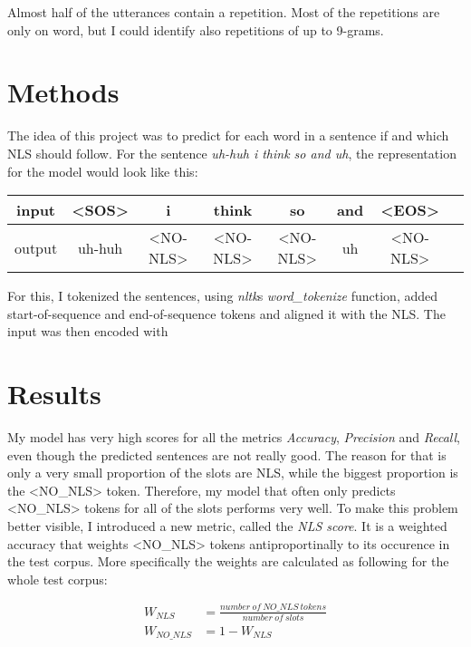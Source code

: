 \documentclass[
	11pt, %
]{fphw}
\begin{document}
Almost half of the utterances contain a repetition. Most of the repetitions are only on word, but I could identify also repetitions of up to 9-grams.





\section*{Methods}
The idea of this project was to predict for each word in a sentence if and which NLS should follow. For the sentence \emph{uh-huh i think so and uh}, the representation for the model would look like this:

\begin{table}[h]
    \centering
    \begin{tabular}{c || c c c c c c c}
        input  & <SOS>  & i        & think    & so       & and & <EOS>    \\
        \hline
        output & uh-huh & <NO-NLS> & <NO-NLS> & <NO-NLS> & uh  & <NO-NLS>
    \end{tabular}
\end{table}

For this, I tokenized the sentences, using \emph{nltk}s \emph{word\_tokenize} function, added start-of-sequence and end-of-sequence tokens and aligned it with the NLS. The input was then encoded with  

\section*{Results}

My model has very high scores for all the metrics \emph{Accuracy}, \emph{Precision} and \emph{Recall}, even though the predicted sentences are not really good. The reason for that is only a very small proportion of the slots are NLS, while the biggest proportion is the <NO\_NLS> token. Therefore, my model that often only predicts <NO\_NLS> tokens for all of the slots performs very well. To make this problem better visible, I introduced a new metric, called the \emph{NLS score}. It is a weighted accuracy that weights <NO\_NLS> tokens antiproportinally to its occurence in the test corpus. More specifically the weights are calculated as following for the whole test corpus:

\begin{align}
    W_{NLS} &= \frac{number\ of\ NO\_NLS\ tokens}{number\ of\ slots} \\
    W_{NO\_NLS} &= 1 - W_{NLS}
\end{align}
\end{document}
